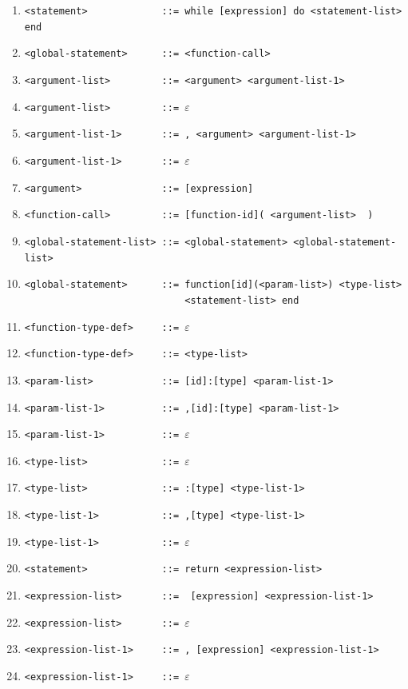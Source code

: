 \documentclass[11pt]{article}
\begin{document}
\begin{enumerate}[noitemsep]
            \item\verb|<statement>             ::= while [expression] do <statement-list> end| 
            \item\verb|<global-statement>      ::= <function-call>| 
            \item\verb|<argument-list>         ::= <argument> <argument-list-1>| 
            \item\verb|<argument-list>         ::= |$\varepsilon$ 
            \item\verb|<argument-list-1>       ::= , <argument> <argument-list-1>| 
            \item\verb|<argument-list-1>       ::= |$\varepsilon$ 
            \item\verb|<argument>              ::= [expression]| 
            \item\verb|<function-call>         ::= [function-id]( <argument-list>  )| 
            \item\verb|<global-statement-list> ::= <global-statement> <global-statement-list>| 
            \item\verb|<global-statement>      ::= function[id](<param-list>) <type-list>| \\  
            \verb|                            <statement-list> end|
            \item\verb|<function-type-def>     ::= |$\varepsilon$ 
            \item\verb|<function-type-def>     ::= <type-list>| 
            \item\verb|<param-list>            ::= [id]:[type] <param-list-1>| 
            \item\verb|<param-list-1>          ::= ,[id]:[type] <param-list-1>| 
            \item\verb|<param-list-1>          ::= |$\varepsilon$ 
            \item\verb|<type-list>             ::= |$\varepsilon$ 
            \item\verb|<type-list>             ::= :[type] <type-list-1>| 
            \item\verb|<type-list-1>           ::= ,[type] <type-list-1>| 
            \item\verb|<type-list-1>           ::= |$\varepsilon$ 
            \item\verb|<statement>             ::= return <expression-list>| 
            \item\verb|<expression-list>       ::=  [expression] <expression-list-1>| 
            \item\verb|<expression-list>       ::= |$\varepsilon$ 
            \item\verb|<expression-list-1>     ::= , [expression] <expression-list-1>| 
            \item\verb|<expression-list-1>     ::= |$\varepsilon$  \end{enumerate}
\end{document}
